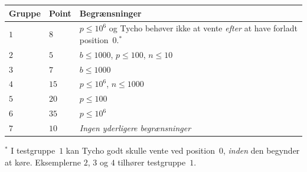 \medskip
\begin{tabular}{lll}
Gruppe & Point & Begrænsninger \\\hline
$1$ & $8$ & $p\leq 10^6$ og Tycho behøver ikke at vente \emph{efter} at have forladt position~$0$.$^*$ \\ %
$2$ & $5$ & $b\leq 1000$, $p\leq 100$, $n\leq 10$ \\
$3$ & $7$ & $b\leq 1000$ \\
$4$ & $15$ & $p\leq 10^6$, $n\leq 1000$\\
$5$ & $20$ & $p\leq 100$\\
$6$ & $35$ & $p\leq 10^6$\\
$7$ & $10$ & \emph{Ingen yderligere begrænsninger}
\end{tabular}

\medskip
\noindent $^*$ I testgruppe~$1$ kan Tycho godt skulle vente ved position~$0$, \emph{inden} den begynder at køre.
Eksemplerne $2$, $3$ og $4$ tilhører testgruppe~$1$.





